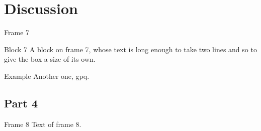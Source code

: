 \documentclass{beamer}
\begin{document}
\section{Discussion}
\begin{frame}{Frame 7}
\begin{block}{Block 7}
A block on frame 7, whose text is long enough to take two lines and so to give the box a size of its own.
\end{block}
\begin{exampleblock}{Example}
Another one, gpq.
\end{exampleblock}
\end{frame}
\subsection{Part 4}
\begin{frame}{Frame 8}
Text of frame 8.
\end{frame}
\end{document}
